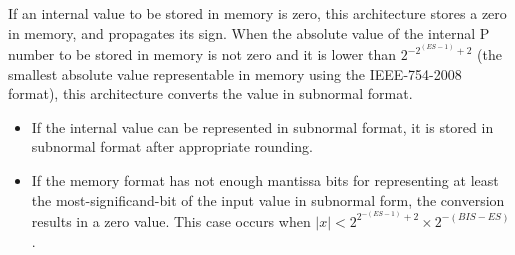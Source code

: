 If an internal value to be stored in memory is zero, this architecture stores a zero in memory, and propagates its sign.
When the absolute value of the internal P number to be stored in memory is not zero and it is lower than $2^{-2^{(ES-1)}+2}$ (the smallest absolute value representable in memory using the IEEE-754-2008 format), this architecture converts the value in subnormal format.
\begin{itemize}
    \item If the internal value can be represented in subnormal format, it is stored in subnormal format after appropriate rounding. 
    \item If the memory format has not enough mantissa bits for representing at least the most-significand-bit of the input value in subnormal form, the conversion results in a zero value.
        This case occurs when $ |x| < 2^{2^{-(ES-1)}+2} \times 2^{-(BIS-ES)}$.
\end{itemize}
